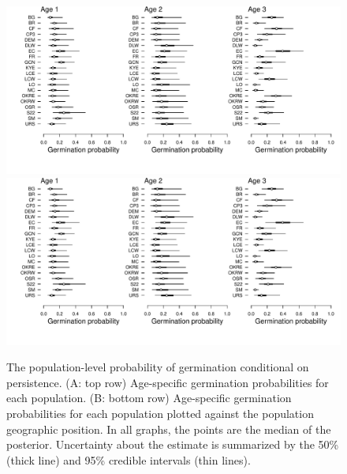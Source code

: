 \documentclass[12pt, oneside]{article}   	%
\begin{document}
 \begin{figure}[!h]
        \centering
        \includegraphics[page=1,width=\textwidth]{../../figures/germination-population.pdf} 
        \includegraphics[page=2,width=\textwidth]{../../figures/germination-population.pdf} 
            \caption{ The population-level probability of germination conditional on persistence. (A: top row) Age-specific germination probabilities for each population. (B: bottom row) Age-specific germination probabilities for each population plotted against the population geographic position. In all graphs, the points are the median of the posterior. Uncertainty about the estimate is summarized by the 50\% (thick line) and 95\% credible intervals (thin lines). }
 \label{fig:germination-estimates-population}
\end{figure}
\end{document}
